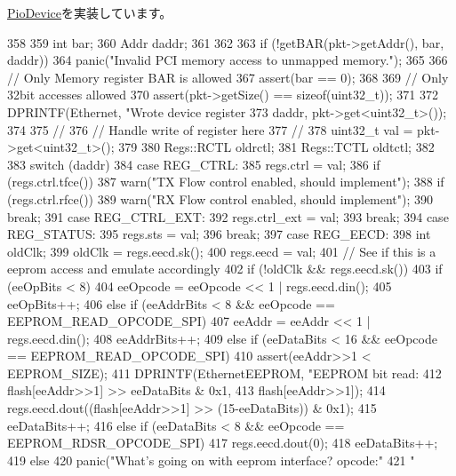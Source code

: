 \hyperlink{classPioDevice_afe8371668d023bb2516b286e5e399b6f}{PioDevice}を実装しています。


\begin{DoxyCode}
358 {
359     int bar;
360     Addr daddr;
361 
362 
363     if (!getBAR(pkt->getAddr(), bar, daddr))
364         panic("Invalid PCI memory access to unmapped memory.\n");
365 
366     // Only Memory register BAR is allowed
367     assert(bar == 0);
368 
369     // Only 32bit accesses allowed
370     assert(pkt->getSize() == sizeof(uint32_t));
371 
372     DPRINTF(Ethernet, "Wrote device register %
373             daddr, pkt->get<uint32_t>());
374 
375     //
376     // Handle write of register here
377     //
378     uint32_t val = pkt->get<uint32_t>();
379 
380     Regs::RCTL oldrctl;
381     Regs::TCTL oldtctl;
382 
383     switch (daddr) {
384       case REG_CTRL:
385         regs.ctrl = val;
386         if (regs.ctrl.tfce())
387             warn("TX Flow control enabled, should implement\n");
388         if (regs.ctrl.rfce())
389             warn("RX Flow control enabled, should implement\n");
390         break;
391       case REG_CTRL_EXT:
392         regs.ctrl_ext = val;
393         break;
394       case REG_STATUS:
395         regs.sts = val;
396         break;
397       case REG_EECD:
398         int oldClk;
399         oldClk = regs.eecd.sk();
400         regs.eecd = val;
401         // See if this is a eeprom access and emulate accordingly
402         if (!oldClk && regs.eecd.sk()) {
403             if (eeOpBits < 8) {
404                 eeOpcode = eeOpcode << 1 | regs.eecd.din();
405                 eeOpBits++;
406             } else if (eeAddrBits < 8 && eeOpcode == EEPROM_READ_OPCODE_SPI) {
407                 eeAddr = eeAddr << 1 | regs.eecd.din();
408                 eeAddrBits++;
409             } else if (eeDataBits < 16 && eeOpcode == EEPROM_READ_OPCODE_SPI) {
410                 assert(eeAddr>>1 < EEPROM_SIZE);
411                 DPRINTF(EthernetEEPROM, "EEPROM bit read: %
412                         flash[eeAddr>>1] >> eeDataBits & 0x1,
413                         flash[eeAddr>>1]);
414                 regs.eecd.dout((flash[eeAddr>>1] >> (15-eeDataBits)) & 0x1);
415                 eeDataBits++;
416             } else if (eeDataBits < 8 && eeOpcode == EEPROM_RDSR_OPCODE_SPI) {
417                 regs.eecd.dout(0);
418                 eeDataBits++;
419             } else
420                 panic("What's going on with eeprom interface? opcode:"
421                       " %
}}}
\end{DoxyCode}
